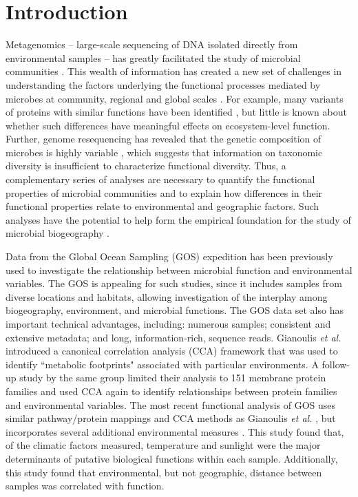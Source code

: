 \section{Introduction}

Metagenomics -- large-scale sequencing of DNA isolated directly from environmental samples -- has greatly facilitated the study of microbial communities \cite{riesenfeld_metagenomics_2004, eisen_environmental_2007, wooley_primer_2010, handelsman_metagenomics_2004, rusch_sorcerer_2007, dinsdale_functional_2008}. This wealth of information has created a new set of challenges in understanding the factors underlying the functional processes mediated by microbes at community, regional and global scales \cite{eisen_environmental_2007}. For example, many variants of proteins with similar functions have been identified \cite{yooseph_sorcerer_2007}, but little is known about whether such differences have meaningful effects on ecosystem-level function. Further, genome resequencing has revealed that the genetic composition of microbes is highly variable \cite{perna_genome_2001, tettelin_genome_2005, rasko_pangenome_2008, kislyuk_genomic_2011, bates_bacterial_2011}, which suggests that information on taxonomic diversity is insufficient to characterize functional diversity.  Thus, a complementary series of analyses are necessary to quantify the functional properties of microbial communities and to explain how differences in their functional properties relate to environmental and geographic factors. Such analyses have the potential to help form the empirical foundation for the study of microbial biogeography \cite{martiny_microbial_2006, green_spatial_2006, green_microbial_2008, nemergut_global_2011}.

Data from the Global Ocean Sampling (GOS) \cite{rusch_sorcerer_2007} expedition has been previously used to investigate the relationship between microbial function and environmental variables. The GOS is appealing for such studies, since it includes samples from diverse locations and habitats, allowing investigation of the interplay among biogeography, environment, and microbial functions. The GOS data set also has important technical advantages, including: numerous samples; consistent and extensive metadata; and long, information-rich, sequence reads. Gianoulis {\em et al.} \cite{gianoulis_quantifying_2009} introduced a canonical correlation analysis (CCA) framework that was used to identify ``metabolic footprints" associated with particular environments. A follow-up study \cite{patel_analysis_2010} by the same group limited their analysis to 151 membrane protein families and used CCA again to identify relationships between protein families and environmental variables. The most recent functional analysis of GOS uses similar pathway/protein mappings and CCA methods as Gianoulis {\em et al.} \cite{gianoulis_quantifying_2009, patel_analysis_2010}, but incorporates several additional environmental measures \cite{raes_toward_2011}.  This study found that, of the climatic factors measured, temperature and sunlight were the major determinants of putative biological functions within each sample. Additionally, this study found that environmental, but not geographic, distance between samples was correlated with function. 


